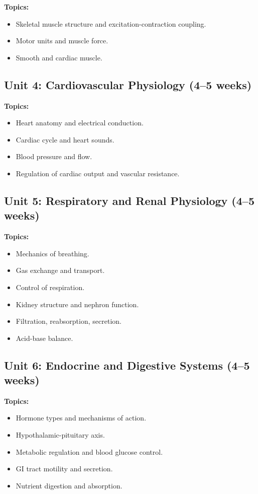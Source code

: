\documentclass[12pt,oneside]{book}
\begin{document}
\textbf{Topics:}
\begin{itemize}
    \item Skeletal muscle structure and excitation-contraction coupling.
    \item Motor units and muscle force.
    \item Smooth and cardiac muscle.
\end{itemize}

\subsection{Unit 4: Cardiovascular Physiology (4--5 weeks)}

\textbf{Topics:}
\begin{itemize}
    \item Heart anatomy and electrical conduction.
    \item Cardiac cycle and heart sounds.
    \item Blood pressure and flow.
    \item Regulation of cardiac output and vascular resistance.
\end{itemize}

\subsection{Unit 5: Respiratory and Renal Physiology (4--5 weeks)}

\textbf{Topics:}
\begin{itemize}
    \item Mechanics of breathing.
    \item Gas exchange and transport.
    \item Control of respiration.
    \item Kidney structure and nephron function.
    \item Filtration, reabsorption, secretion.
    \item Acid-base balance.
\end{itemize}

\subsection{Unit 6: Endocrine and Digestive Systems (4--5 weeks)}

\textbf{Topics:}
\begin{itemize}
    \item Hormone types and mechanisms of action.
    \item Hypothalamic-pituitary axis.
    \item Metabolic regulation and blood glucose control.
    \item GI tract motility and secretion.
    \item Nutrient digestion and absorption.
\end{itemize}
\end{document}
